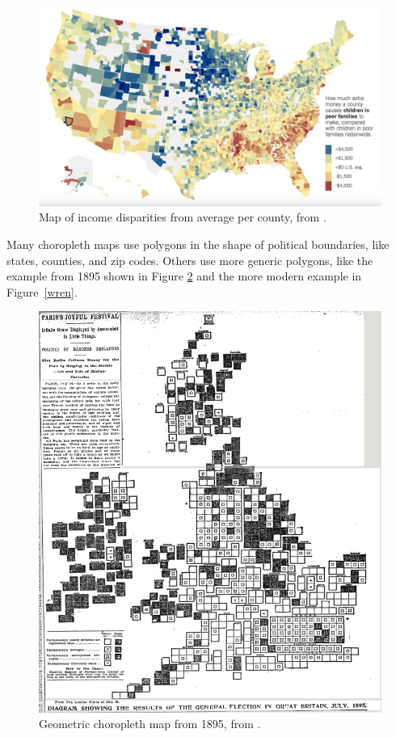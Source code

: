 \documentclass{article}\usepackage[]{graphicx}\usepackage[]{color}
\begin{document}
\begin{figure}[htbp]
\begin{centering}
\includegraphics[width=\textwidth]{../img/choropleth}
\caption{Map of income disparities from average per county, from \cite{AisBut2015}.}\label{choropleth}
\end{centering}
\end{figure}

Many choropleth maps use polygons in the shape of political boundaries, like states, counties, and zip codes. Others use more generic polygons, like the example from 1895 shown in Figure \ref{1895} and the more modern example in Figure~\ref{wren}.

\begin{figure}[htbp]
\begin{centering}
\includegraphics[height=0.4\textheight]{../img/1895}
\caption{Geometric choropleth map from 1895, from \cite{Fel2015}.}\label{1895}
\end{centering}
\end{figure}
\end{document}
